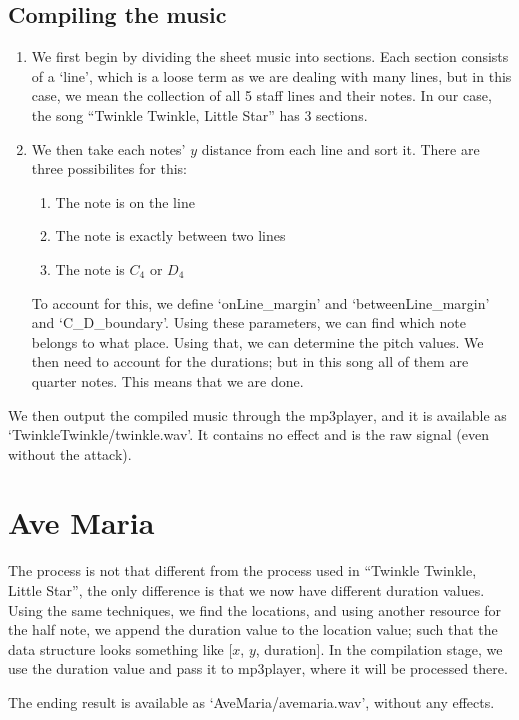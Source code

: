 \documentclass[12pt]{article}
\begin{document}
\subsection{Compiling the music}
\begin{enumerate}
    \item We first begin by dividing the sheet music into sections. Each section consists of a `line', which is a loose term
    as we are dealing with many lines, but in this case, we mean the collection of all 5 staff lines and their notes. In our
    case, the song ``Twinkle Twinkle, Little Star'' has 3 sections.
    \item We then take each notes' $y$ distance from each line and sort it. There are three possibilites for this:
        \begin{enumerate}
            \item The note is on the line
            \item The note is exactly between two lines
            \item The note is $C_4$ or $D_4$
        \end{enumerate}
    To account for this, we define `onLine\_margin' and `betweenLine\_margin' and `C\_D\_boundary'. Using these parameters, we can
    find which note belongs to what place. Using that, we can determine the pitch values. We then need to account for the durations;
    but in this song all of them are quarter notes. This means that we are done.
\end{enumerate}

We then output the compiled music through the mp3player, and it is available as `TwinkleTwinkle/twinkle.wav'. It contains no effect
and is the raw signal (even without the attack).

\section{Ave Maria}
The process is not that different from the process used in ``Twinkle Twinkle, Little Star'', the only difference is that we now have
different duration values. Using the same techniques, we find the locations, and using another resource for the half note, we append the
duration value to the location value; such that the data structure looks something like [$x$, $y$, duration].
In the compilation stage, we use the duration value and pass it to mp3player, where it will be processed there.

The ending result is available as `AveMaria/avemaria.wav', without any effects.
\end{document}
